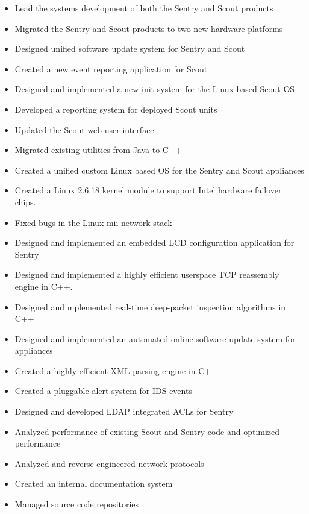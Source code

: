 \documentclass[margin,line]{resume}
\begin{document}
\begin{resume}
\begin{itemize}
\item Lead the systems development of both the Sentry and Scout products
\item Migrated the Sentry and Scout products to two new hardware platforms
\item Designed unified software update system for Sentry and Scout
\item Created a new event reporting application for Scout
\item Designed and implemented a new init system for the Linux based Scout OS
\item Developed a reporting system for deployed Scout units
\item Updated the Scout web user interface
\item Migrated existing utilities from Java to C++
\item Created a unified custom Linux based OS for the Sentry and Scout
      appliances
\item Created a Linux 2.6.18 kernel module to support Intel hardware failover
      chips.
\item Fixed bugs in the Linux mii network stack
\item Designed and implemented an embedded LCD configuration application for
      Sentry
\item Designed and implemented a highly efficient userspace TCP reassembly
      engine in C++.
\item Designed and mplemented real-time deep-packet inspection algorithms in C++
\item Designed and implemented an automated online software update system for
      appliances
\item Created a highly efficient XML parsing engine in C++
\item Created a pluggable alert system for IDS events
\item Designed and developed LDAP integrated ACLs for Sentry
\item Analyzed performance of existing Scout and Sentry code and optimized
      performance
\item Analyzed and reverse engineered network protocols
\item Created an internal documentation system
\item Managed source code repositories
\end{itemize}


\end{resume}
\end{document}
